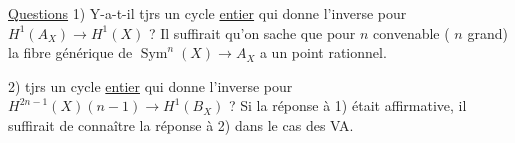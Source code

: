 \uline{Questions} 1) Y-a-t-il tjrs un cycle \uline{entier} qui donne l'inverse pour $H^1(A_X)\to H^1(X)$ ? Il suffirait qu'on sache que pour $n$  convenable ( $n$ grand) la fibre générique de $\operatorname{Sym}^n(X)\to A_X$ a un point rationnel.

2)  tjrs un cycle \uline{entier} qui donne l'inverse pour $H^{2n-1}(X)(n-1)\to H^1(B_X)$ ? Si la réponse à 1) était affirmative, il suffirait de connaître la réponse à 2) dans le cas des VA.

